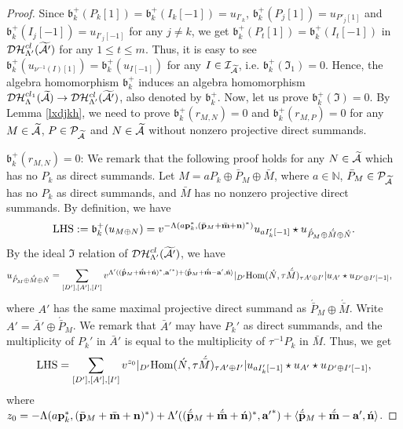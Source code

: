 \documentclass[reqno,12pt]{amsart}
\numberwithin{equation}{section}
\def\lr#1{\langle #1\rangle} \def\fin{\hfill$\square$}  \def\lra{\longrightarrow} \def\mod{\mbox{\rm \textbf{mod}}\,}\def\Mod{\mbox{\rm mod}\,}\def\top{\mbox{\rm top}\,}\def\soc{\mbox{\rm soc}\,}
\theoremstyle{plain} %
\theoremstyle{definition} %
\begin{document}
\begin{proof}
Since $\mathfrak{b}_k^+(P_k[1])=\mathfrak{b}_k^+(I_k[-1])=u_{I'_k}$,
$\mathfrak{b}_k^+(P_j[1])=u_{P'_j[1]}$ and $\mathfrak{b}_k^+(I_j[-1])=u_{I'_j[-1]}$ for any $j\neq k$, we get
$\mathfrak{b}_k^+(P_t[1])=\mathfrak{b}_k^+(I_t[-1])$ in $\mathcal{DH}_{\Lambda'}^{cl}(\widetilde{\mathcal{A}'})$ for any $1\leq t\leq m$. Thus, it is easy to see
$\mathfrak{b}_k^+(u_{\nu^{-1}(I)[1]})=\mathfrak{b}_k^+(u_{I[-1]})$ for any $I\in\mathcal{I}_{\widetilde{\mathcal{A}}}$,
i.e. $\mathfrak{b}_k^+(\mathfrak{I}_1)=0$. Hence, the algebra homomorphism $\mathfrak{b}_k^+$ induces an algebra homomorphism $\mathcal {D}\mathcal {H}_\Lambda^{{cl}_1}(\widetilde{\mathcal{A}})\rightarrow\mathcal {D}\mathcal {H}_{\Lambda'}^{{cl}}(\widetilde{\mathcal{A}'})$, also denoted by $\mathfrak{b}_k^+$.
Now, let us prove $\mathfrak{b}_k^+(\mathfrak{I})=0$. By Lemma \ref{lxdjkh}, we need to prove $\mathfrak{b}_k^+(r_{M,N})=0$ and $\mathfrak{b}_k^+(r_{M,P})=0$ for any $M\in{\widetilde{\mathcal{A}}}$, $P\in \mathcal{P}_{\widetilde{\mathcal{A}}}$ and $N\in{\widetilde{\mathcal{A}}}$ without nonzero projective direct summands.

 $\mathfrak{b}_k^+(r_{M,N})=0$:
We remark that the following proof holds for any $N\in{\widetilde{\mathcal{A}}}$ which has no $P_k$ as direct summands. Let $M=aP_k\oplus \bar{P}_M\oplus \bar{M}$, where $a\in\mathbb{N}$, $\bar{P}_M\in \mathcal{P}_{\widetilde{\mathcal{A}}}$ has no $P_k$ as direct summands, and $\bar{M}$ has no nonzero projective direct summands. By definition, we have
\begin{align*}
{\rm LHS}:=\mathfrak{b}_k^+(u_{M\oplus N})=v^{-\Lambda(a\mathbf{p}_k^\ast,(\bar{\bf p}_M+\bar{\bf m}+{\bf n})^\ast)}u_{aI_k'[-1]}\star u_{\acute{\bar{P}}_M\oplus \acute{\bar{M}}\oplus \acute{N}}.
\end{align*}
	By the ideal $\mathfrak{I}$ relation of $\mathcal{DH}_{\Lambda'}^{cl}(\widetilde{\mathcal{A}'})$, we have
	\begin{align*}
		u_{\acute{\bar{P}}_M\oplus \acute{\bar{M}}\oplus \acute{N}}&=\sum_{[D'],[A'],[I']}v^{\Lambda'((\acute{\bar{\mathbf{p} }}_M+\acute{\bar{\mathbf{m} }}+\acute{\mathbf{n} })^\ast,{\mathbf{a}'}^\ast)+\lr{\acute{\bar{\mathbf{p} }}_M+\acute{\bar{\mathbf{m} }}-{\mathbf{a}'},\acute{\mathbf{n}}}}|_{D'}\Hom(\acute{N},\tau \acute{\bar{M}})_{\tau A'\oplus I'}|u_{A'}\star u_{D'\oplus I'[-1]},
	\end{align*}
	where $A'$ has the same maximal projective direct summand as $\acute{\bar{P}}_M\oplus\acute{\bar{M}}$. Write $A'=\bar{A}'\oplus \acute{\bar{P}}_M$. We remark that $\bar{A}'$ may have $P_k'$ as direct summands, and the multiplicity of $P_k'$ in $\bar{A}'$ is equal to the multiplicity of $\tau^{-1}P_k$ in $\bar{M}$.  Thus, we get
	\begin{equation}\label{zuoshoubian}
		{\rm LHS}=\sum_{[D'],[A'],[I']}v^{z_0}
		|_{D'}\mbox{\rm Hom}(\acute{N},\tau \acute{\bar{M}})_{\tau A'\oplus I'}|u_{aI_k'[-1]}\star u_{A'}\star u_{D'\oplus I'[-1]},
	\end{equation}
where $z_0=-\Lambda(a\mathbf{p}_k^\ast,(\bar{\bf p}_M+\bar{\bf m}+{\bf n})^\ast)+\Lambda'((\acute{\bar{\mathbf{p} }}_M+\acute{\bar{\mathbf{m} }}+\acute{\mathbf{n} })^\ast,{\mathbf{a}'}^\ast)+\lr{\acute{\bar{\mathbf{p} }}_M+\acute{\bar{\mathbf{m} }}-{\mathbf{a}'},\acute{\mathbf{n}}}$.


\end{proof}
\end{document}

